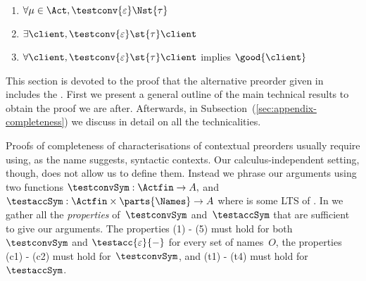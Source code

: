 \begin{table*}
\begin{minipage}{300pt}
    \end{minipage}
  \\[2em]
      \begin{minipage}{300pt}
      \begin{enumerate}[(c1)]
      \item
        $\forall \mu \in \Act, \testconv{\varepsilon} \Nst{\tau}$ \qquad
      \item
        $\exists \client, \testconv{\varepsilon} \st{\tau} \client$ \qquad
      \item
        $\forall \client, \testconv{\varepsilon} \st{\tau} \client$ implies
        $\good{ \client }$
        \\
      \end{enumerate}
      \end{minipage}
  \caption{Properties of the functions that generate clients.}
\hrulefill
\label{tab:properties-functions-to-generate-clients}
\end{table*}





This section is devoted to the proof that the alternative preorder
given in  includes the \mustpreorder.
First we present a general outline of the main technical results to obtain
the proof we are after. Afterwards, in Subsection~(\ref{sec:appendix-completeness})
we discuss in detail on all the technicalities.


Proofs of completeness of characterisations of contextual preorders usually
require using, as the name suggests, syntactic contexts.
Our calculus-independent setting, though, does not allow us to
define them.  Instead we phrase our arguments using two functions
$
\testconvSym :  \Actfin \rightarrow \States,$ and
$\testaccSym :  \Actfin \times \parts{\Names} \rightarrow \States$
where  is some LTS of \obaFB.
In  we gather all the
{\em properties} of~$\testconvSym$ and~$\testaccSym$ that are sufficient to give our
arguments. The properties (1) - (5) must hold for both~$\testconvSym$ and
$\testacc{\varepsilon}{-}$ for every set of names~$O$, the properties (c1) -
(c2) must hold for~$\testconvSym$, and (t1) - (t4) must hold for~$\testaccSym$.


